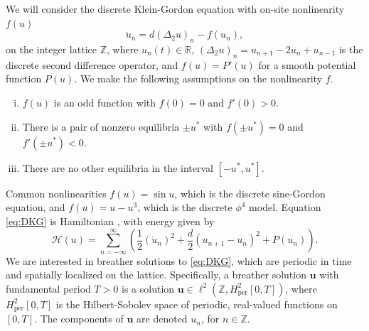\documentclass[12pt,reqno]{amsart}
\def\R{{\mathbb R}}
\def\Z{{\mathbb Z}}
\def\per{\textrm{per}}
\newcommand{\uvec}{\mathbf{u}}
\begin{document}
We will consider the discrete Klein-Gordon equation with on-site nonlinearity $f(u)$
\begin{equation}\label{eq:DKG}
\ddot{u}_n = d (\Delta_2 u)_n - f(u_n),
\end{equation}
on the integer lattice $\Z$, where $u_n(t) \in \R$, $(\Delta_2 u)_n = u_{n+1} - 2 u_n + u_{n-1}$ is the discrete second difference operator, and $f(u) = P'(u)$ for a smooth potential function $P(u)$. We make the following assumptions on the nonlinearity $f$. 
\begin{enumerate}[(i)]
	\item $f(u)$ is an odd function with $f(0) = 0$ and $f'(0) > 0$.
	\item There is a pair of nonzero equilibria $\pm u^*$ with $f(\pm u^*) = 0$ and $f'(\pm u^*) < 0$.
	\item There are no other equilibria in the interval $[-u^*, u^*]$.
\end{enumerate}
Common nonlinearities $f(u) = \sin u$, which is the discrete sine-Gordon equation, and $f(u) = u - u^3$, which is the discrete $\phi^4$ model. Equation \cref{eq:DKG} is Hamiltonian \cite{KevrekidisWeinstein2000}, with energy given by
\begin{equation}\label{eq:H}
	\mathcal{H}(u) = \sum_{n=-\infty}^\infty 
	\left( \frac{1}{2} (\dot{u}_n)^2 + \frac{d}{2} (u_{n+1} - u_n)^2 + P(u_n) \right).
\end{equation}
We are interested in breather solutions to \cref{eq:DKG}, which are periodic in time and spatially localized on the lattice. Specifically, a breather solution $\uvec$ with fundamental period $T>0$ is a solution $\uvec \in \ell^2(\Z, H^2_\per[0,T])$, where $H^2_\per[0,T]$ is the Hilbert-Sobolev space of periodic, real-valued functions on $[0,T]$. The components of $\uvec$ are denoted $u_n$, for $n \in \Z$.
\end{document}
